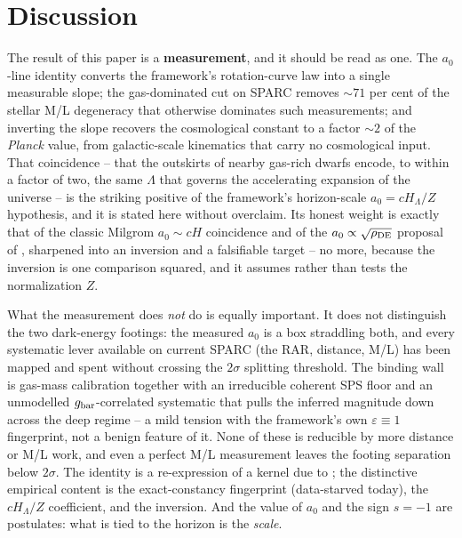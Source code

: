 \documentclass[fleqn,usenatbib]{mnras}
\begin{document}

\section{Discussion}
\label{sec:discussion}

The result of this paper is a \textbf{measurement}, and it should be read as one. The $a_0$-line identity converts the framework's rotation-curve law into a single measurable slope; the gas-dominated cut on SPARC removes ${\sim}71$ per cent of the stellar M/L degeneracy that otherwise dominates such measurements; and inverting the slope recovers the cosmological constant to a factor ${\sim}2$ of the \textit{Planck} value, from galactic-scale kinematics that carry no cosmological input. That coincidence -- that the outskirts of nearby gas-rich dwarfs encode, to within a factor of two, the same $\Lambda$ that governs the accelerating expansion of the universe -- is the striking positive of the framework's horizon-scale $a_0=cH_\Lambda/Z$ hypothesis, and it is stated here without overclaim. Its honest weight is exactly that of the classic Milgrom $a_0\sim cH$ coincidence and of the $a_0\propto\sqrt{\rho_{\rm DE}}$ proposal of \citet{Limbach2008}, sharpened into an inversion and a falsifiable target -- no more, because the inversion is one comparison squared, and it assumes rather than tests the normalization $Z$.

What the measurement does \emph{not} do is equally important. It does not distinguish the two dark-energy footings: the measured $a_0$ is a box straddling both, and every systematic lever available on current SPARC (the RAR, distance, M/L) has been mapped and spent without crossing the $2\sigma$ splitting threshold. The binding wall is gas-mass calibration together with an irreducible coherent SPS floor and an unmodelled $g_{\rm bar}$-correlated systematic that pulls the inferred magnitude down across the deep regime -- a mild tension with the framework's own $\varepsilon\equiv1$ fingerprint, not a benign feature of it. None of these is reducible by more distance or M/L work, and even a perfect M/L measurement leaves the footing separation below $2\sigma$. The identity is a re-expression of a kernel due to \citet{Milgrom1999}; the distinctive empirical content is the exact-constancy fingerprint (data-starved today), the $cH_\Lambda/Z$ coefficient, and the inversion. And the value of $a_0$ and the sign $s=-1$ are postulates: what is tied to the horizon is the \emph{scale}.
\end{document}
